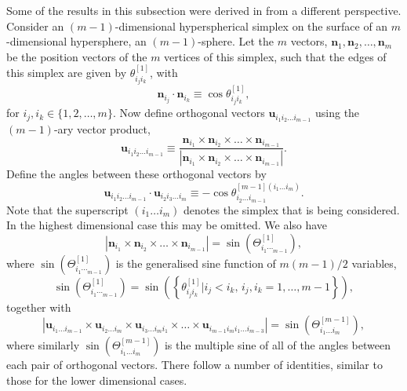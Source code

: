 \documentclass[fleqn,11pt,twoside]{article}
\theoremstyle{definition}
\begin{document}
Some of the results in this subsection were derived in \cite{sato} from a different perspective. 
Consider an $(m-1)$-dimensional hyperspherical simplex on the surface of an $m$-dimensional hypersphere, an $(m-1)$-sphere. Let the $m$ vectors, $\mathbf{n}_1,\mathbf{n}_2,\dots,\mathbf{n}_m$ be the position vectors of the $m$ vertices of this simplex, such that the edges of this simplex are given by $\theta^{[1]}_{i_ji_k}$, with
\begin{equation}
\mathbf{n}_{i_j}\cdot \mathbf{n}_{i_k}\equiv\cos\theta^{[1]}_{i_ji_k},
\end{equation}
for $i_j,i_k\in\{1,2,\dots,m\}$. Now define orthogonal vectors $\mathbf{u}_{i_1i_2\dots i_{m-1}}$ using the $(m-1)$-ary vector product,
\begin{equation}
\mathbf{u}_{i_1i_2\dots i_{m-1}}\equiv\frac{\mathbf{n}_{i_1}\times\mathbf{n}_{i_2}\times\dots\times\mathbf{n}_{i_{m-1}}}{|\mathbf{n}_{i_1}\times\mathbf{n}_{i_2}\times\dots\times\mathbf{n}_{i_{m-1}}|}.
\end{equation}
Define the angles between these orthogonal vectors by
\begin{equation}
\mathbf{u}_{i_1i_2\dots i_{m-1}}\cdot\mathbf{u}_{i_2i_3\dots i_{m}}\equiv-\cos\theta^{[m-1](i_1\dots i_{m})}_{i_2\dots i_{m-1}}.
\end{equation}
Note that the superscript $(i_1\dots i_m)$ denotes the simplex that is being considered. In the highest dimensional case this may be omitted.
We also have
\begin{equation}
|\mathbf{n}_{i_1}\times\mathbf{n}_{i_2}\times\dots\times\mathbf{n}_{i_{m-1}}|=\sin\left(\Theta^{[1]}_{i_1\dotsi_{m-1}}\right),
\end{equation}
where $\sin\left(\Theta^{[1]}_{i_1\dotsi_{m-1}}\right)$ is the generalised sine function of $m(m-1)/2$ variables,
\begin{equation}
\sin\left(\Theta^{[1]}_{i_1\dotsi_{m-1}}\right)=\sin\left(\left\{\theta^{[1]}_{i_ji_k}\bigg|i_j< i_k,\, i_j,i_k=1,\dots,m-1\right\}\right),
\end{equation}
together with 
\begin{equation}
|\mathbf{u}_{i_1\dots i_{m-1}}\times\mathbf{u}_{i_2\dots i_{m}}\times\mathbf{u}_{i_3\dots i_{m}i_1}\times\dots\times\mathbf{u}_{i_{m-1}i_mi_1\dots i_{m-3}}|=\sin\left(\Theta^{[m-1]}_{i_1\dots i_m}\right),
\end{equation}
where similarly $\sin\left(\Theta^{[m-1]}_{i_1\dots i_m}\right)$ is the multiple sine of all of the angles between each pair of orthogonal vectors.
There follow a number of identities, similar to those for the lower dimensional cases.
\end{document}
